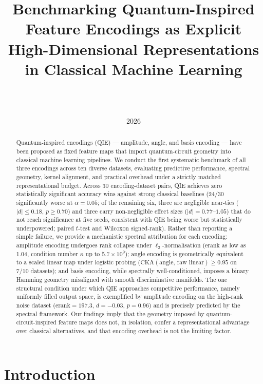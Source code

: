 \documentclass[12pt]{article}
\title{%
  \textbf{Benchmarking Quantum-Inspired Feature Encodings as Explicit
  High-Dimensional Representations in Classical Machine Learning}%
}
\author{%
  \TODO{Author names}\\
  \TODO{Institution}\\
  \texttt{\TODO{email}}
}
\date{\TODO{Month} 2026}
\newcommand{\erank}{\mathrm{erank}}
\begin{document}
\maketitle

\begin{abstract}
Quantum-inspired encodings (QIE) --- amplitude, angle, and basis encoding ---
have been proposed as fixed feature maps that import quantum-circuit geometry
into classical machine learning pipelines.
We conduct the first systematic benchmark of all three encodings across ten
diverse datasets, evaluating predictive performance, spectral geometry, kernel
alignment, and practical overhead under a strictly matched representational budget.
Across 30 encoding-dataset pairs, QIE achieves zero statistically significant
accuracy wins against strong classical baselines (24/30 significantly worse at
$\alpha{=}0.05$; of the remaining six, three are negligible near-ties
($|d|\leq 0.18$, $p\geq 0.70$) and three carry non-negligible effect sizes
($|d|=0.77$--$1.05$) that do not reach significance at five seeds, consistent
with QIE being worse but statistically underpowered; paired $t$-test and
Wilcoxon signed-rank).
Rather than reporting a simple failure, we provide a mechanistic spectral
attribution for each encoding: amplitude encoding undergoes rank collapse under
$\ell_2$-normalisation ($\erank$ as low as 1.04, condition number $\kappa$
up to $5.7{\times}10^9$); angle encoding is geometrically equivalent to a
scaled linear map under logistic probing
($\mathrm{CKA}(\text{angle, raw linear})\geq 0.95$ on 7/10 datasets);
and basis encoding, while spectrally well-conditioned, imposes a binary Hamming
geometry misaligned with smooth discriminative manifolds.
The one structural condition under which QIE approaches competitive performance,
namely uniformly filled output space, is exemplified by amplitude encoding on the
high-rank noise dataset ($\erank{=}197.3$, $d{=}{-}0.03$, $p{=}0.96$) and is
precisely predicted by the spectral framework.
Our findings imply that the geometry imposed by quantum-circuit-inspired feature
maps does not, in isolation, confer a representational advantage over classical
alternatives, and that encoding overhead is not the limiting factor.
\end{abstract}

\section{Introduction}
\label{sec:intro}
\end{document}
